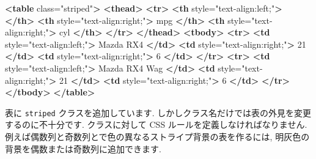 \documentclass[
  11pt,
  lualatex,ja=standard,jafont=noto]{bxjsreport}
\newenvironment{Shaded}{\begin{snugshade}}{\end{snugshade}}
\newcommand{\KeywordTok}[1]{\textcolor[rgb]{0.13,0.29,0.53}{\textbf{#1}}}
\newcommand{\NormalTok}[1]{#1}
\newcommand{\OtherTok}[1]{\textcolor[rgb]{0.56,0.35,0.01}{#1}}
\newcommand{\StringTok}[1]{\textcolor[rgb]{0.31,0.60,0.02}{#1}}
\begin{document}
\begin{Shaded}
\begin{Highlighting}[]
\KeywordTok{\textless{}table}\OtherTok{ class=}\StringTok{"striped"}\KeywordTok{\textgreater{}}
 \KeywordTok{\textless{}thead\textgreater{}}
  \KeywordTok{\textless{}tr\textgreater{}}
   \KeywordTok{\textless{}th}\OtherTok{ style=}\StringTok{"text{-}align:left;"}\KeywordTok{\textgreater{}}   \KeywordTok{\textless{}/th\textgreater{}}
   \KeywordTok{\textless{}th}\OtherTok{ style=}\StringTok{"text{-}align:right;"}\KeywordTok{\textgreater{}}\NormalTok{ mpg }\KeywordTok{\textless{}/th\textgreater{}}
   \KeywordTok{\textless{}th}\OtherTok{ style=}\StringTok{"text{-}align:right;"}\KeywordTok{\textgreater{}}\NormalTok{ cyl }\KeywordTok{\textless{}/th\textgreater{}}
  \KeywordTok{\textless{}/tr\textgreater{}}
 \KeywordTok{\textless{}/thead\textgreater{}}
\KeywordTok{\textless{}tbody\textgreater{}}
  \KeywordTok{\textless{}tr\textgreater{}}
   \KeywordTok{\textless{}td}\OtherTok{ style=}\StringTok{"text{-}align:left;"}\KeywordTok{\textgreater{}}\NormalTok{ Mazda RX4 }\KeywordTok{\textless{}/td\textgreater{}}
   \KeywordTok{\textless{}td}\OtherTok{ style=}\StringTok{"text{-}align:right;"}\KeywordTok{\textgreater{}}\NormalTok{ 21 }\KeywordTok{\textless{}/td\textgreater{}}
   \KeywordTok{\textless{}td}\OtherTok{ style=}\StringTok{"text{-}align:right;"}\KeywordTok{\textgreater{}}\NormalTok{ 6 }\KeywordTok{\textless{}/td\textgreater{}}
  \KeywordTok{\textless{}/tr\textgreater{}}
  \KeywordTok{\textless{}tr\textgreater{}}
   \KeywordTok{\textless{}td}\OtherTok{ style=}\StringTok{"text{-}align:left;"}\KeywordTok{\textgreater{}}\NormalTok{ Mazda RX4 Wag }\KeywordTok{\textless{}/td\textgreater{}}
   \KeywordTok{\textless{}td}\OtherTok{ style=}\StringTok{"text{-}align:right;"}\KeywordTok{\textgreater{}}\NormalTok{ 21 }\KeywordTok{\textless{}/td\textgreater{}}
   \KeywordTok{\textless{}td}\OtherTok{ style=}\StringTok{"text{-}align:right;"}\KeywordTok{\textgreater{}}\NormalTok{ 6 }\KeywordTok{\textless{}/td\textgreater{}}
  \KeywordTok{\textless{}/tr\textgreater{}}
\KeywordTok{\textless{}/tbody\textgreater{}}
\KeywordTok{\textless{}/table\textgreater{}}
\end{Highlighting}
\end{Shaded}

表に \texttt{striped} クラスを追加しています. しかしクラス名だけでは表の外見を変更するのに不十分です. クラスに対して CSS ルールを定義しなければなりません. 例えば偶数列と奇数列とで色の異なるストライプ背景の表を作るには, 明灰色の背景を偶数または奇数列に追加できます.
\end{document}
